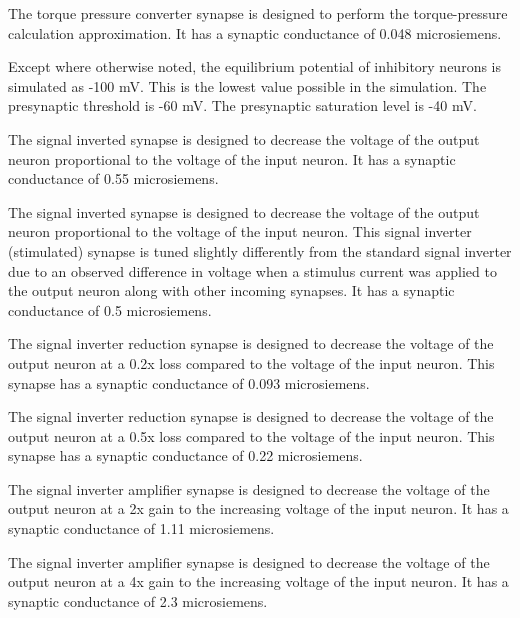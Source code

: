 
The torque pressure converter synapse is designed to perform the torque-pressure
calculation approximation. It has a synaptic 
conductance of 0.048 microsiemens.


Except where otherwise noted, the equilibrium potential of inhibitory neurons
is simulated as -100 mV. This is the lowest value possible in the simulation.
The presynaptic threshold is -60 mV. The presynaptic saturation level is -40
mV.


The signal inverted synapse is designed to decrease the voltage of the output 
neuron proportional to the voltage of the input neuron. It has a synaptic 
conductance of 0.55 microsiemens.


The signal inverted synapse is designed to decrease the voltage of the output 
neuron proportional to the voltage of the input neuron. This signal inverter (stimulated) synapse is tuned
slightly differently from the standard signal inverter due to an
observed difference in voltage when a stimulus current was applied to the output
neuron along with other incoming synapses. It has a synaptic 
conductance of 0.5 microsiemens.


The signal inverter reduction synapse is designed to decrease the voltage of
the output 
neuron at a 0.2x loss compared to the voltage of the input neuron. This synapse has a 
synaptic conductance of 0.093 microsiemens.


The signal inverter reduction synapse is designed to decrease the voltage of
the output 
neuron at a 0.5x loss compared to the voltage of the input neuron. This synapse has a 
synaptic conductance of 0.22 microsiemens.


The signal inverter amplifier synapse is designed to decrease the voltage of
the output 
neuron at a 2x gain to the increasing voltage of the input neuron. It has a synaptic 
conductance of 1.11 microsiemens.


The signal inverter amplifier synapse is designed to decrease the voltage of
the output 
neuron at a 4x gain to the increasing voltage of the input neuron. It has a synaptic 
conductance of 2.3 microsiemens.

